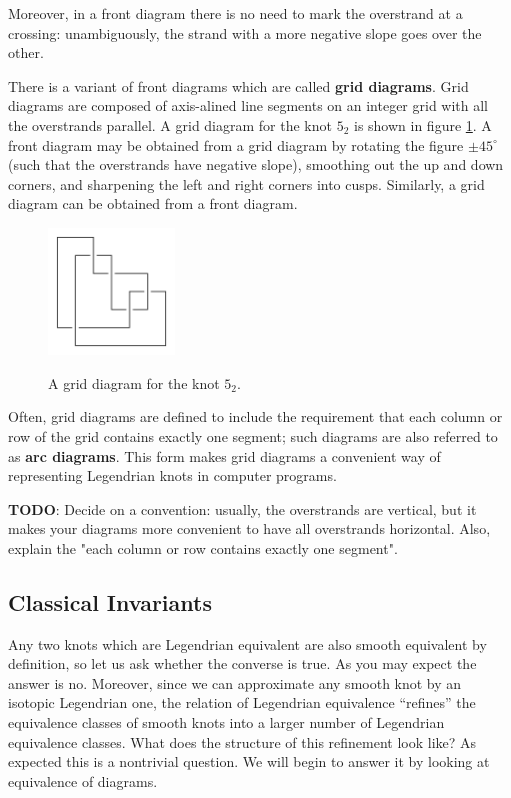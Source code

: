 Moreover, in a front diagram there is no need to mark the overstrand at a crossing: unambiguously, the strand with a more negative slope goes over the other.

There is a variant of front diagrams which are called \textbf{grid diagrams}. Grid diagrams are composed of axis-alined line segments on an integer grid with all the overstrands parallel. 
A grid diagram for the knot $5_2$ is shown in figure \ref{fig:grid}.
A front diagram may be obtained from a grid diagram by rotating the figure $\pm 45^\circ$ (such that the overstrands have negative slope), smoothing out the up and down corners, and sharpening the left and right corners into cusps. Similarly, a grid diagram can be obtained from a front diagram. 

\begin{figure}[ht]
    \centering
    \includegraphics[width=0.3\textwidth]{images/5_2-grid.pdf}
    \label{fig:grid}
    \caption{A grid diagram for the knot $5_2$.}
\end{figure}

Often, grid diagrams are defined to include the requirement that each column or row of the grid contains exactly one segment; such diagrams are also referred to as \textbf{arc diagrams}. This form makes grid diagrams a convenient way of representing Legendrian knots in computer programs.

\textbf{TODO}: Decide on a convention: usually, the overstrands are vertical, but it makes your diagrams more convenient to have all overstrands horizontal. Also, explain the "each column or row contains exactly one segment".


\subsection{Classical Invariants}

Any two knots which are Legendrian equivalent are also smooth equivalent by definition, so let us ask whether the converse is true.
As you may expect the answer is no. Moreover, since we can approximate any smooth knot by an isotopic Legendrian one, the relation of Legendrian equivalence ``refines'' the equivalence classes of smooth knots into a larger number of Legendrian equivalence classes. What does the structure of this refinement look like? As expected this is a nontrivial question. We will begin to answer it by looking at equivalence of diagrams.

